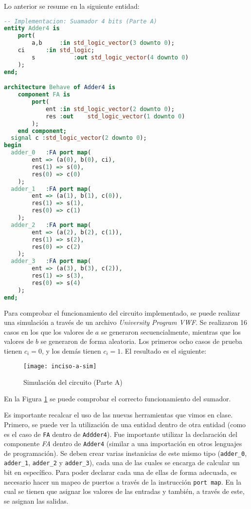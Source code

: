 \documentclass[../procedimientos.tex]{subfiles}
\begin{document}
Lo anterior se resume en la siguiente entidad:
\begin{lstlisting}[language=VHDL]
-- Implementacion: Suamador 4 bits (Parte A)
entity Adder4 is
	port(
		a,b		:in std_logic_vector(3 downto 0);
    ci		:in std_logic;
		s			:out std_logic_vector(4 downto 0)
	);
end;

architecture Behave of Adder4 is
	component FA is
		port(
			ent	:in	std_logic_vector(2 downto 0);
			res	:out	std_logic_vector(1 downto 0)
		);
	end component;
  signal c :std_logic_vector(2 downto 0);
begin
  adder_0	:FA port map(
		ent => (a(0), b(0), ci),
		res(1) => s(0),
		res(0) => c(0)
	);
  adder_1	:FA port map(
		ent => (a(1), b(1), c(0)),
		res(1) => s(1),
		res(0) => c(1)
	);
  adder_2	:FA port map(
		ent => (a(2), b(2), c(1)),
		res(1) => s(2),
		res(0) => c(2)
	);
  adder_3	:FA port map(
		ent => (a(3), b(3), c(2)),
		res(1) => s(3),
		res(0) => s(4)
	);
end;
\end{lstlisting}

Para comprobar el funcionamiento del circuito implementado, se puede realizar 
una simulación a través de un archivo \textit{University Program VWF}. Se 
realizaron 16 casos en los que los valores de $a$ se generaron 
secuencialmente, mientras que los valores de $b$ se generaron de forma 
aleatoria. Los primeros ocho casos de prueba tienen $c_i = 0$, y los demás 
tienen $c_i = 1$. El resultado es el siguiente:
\begin{figure}[H]
  \centering
  \texttt{[image: inciso-a-sim]}
  \caption{Simulación del circuito (Parte A)}
  \label{fig:inciso_a_sim}
\end{figure}

En la Figura \ref{fig:inciso_a_sim} se puede comprobar el correcto 
funcionamiento del sumador.

Es importante recalcar el uso de las nuevas herramientas que vimos en clase.  
Primero, se puede ver la utilización de una entidad dentro de otra entidad 
(como es el caso de \texttt{FA} dentro de \texttt{Addder4}). Fue importante 
utilizar la declaración del componente \textit{FA} dentro de \texttt{Adder4} 
(similar a una importación en otros lenguajes de programación). Se deben crear 
varias instanicias de este mismo tipo (\texttt{adder\_0}, \texttt{adder\_1}, 
\texttt{adder\_2} y \texttt{adder\_3}), cada una de las cuales se encarga de 
calcular un bit en específico. Para poder declarar cada una de ellas de forma 
adecuada, es necesario hacer un mapeo de puertos a través de la instrucción 
\texttt{port map}. En la cual se tienen que asignar los valores de las 
entradas y también, a través de este, se asignan las salidas.
\end{document}
